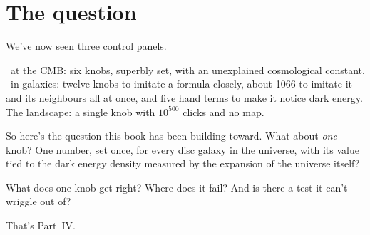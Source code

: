 \section{The question}

We've now seen three control panels.

\LCDM\ at the CMB: six knobs, superbly set, with an unexplained cosmological constant. \LCDM\ in galaxies: twelve knobs to imitate a formula closely, about 1066 to imitate it and its neighbours all at once, and five hand terms to make it notice dark energy. The landscape: a single knob with $10^{500}$ clicks and no map.

So here's the question this book has been building toward. What about \emph{one} knob? One number, set once, for every disc galaxy in the universe, with its value tied to the dark energy density measured by the expansion of the universe itself?

What does one knob get right? Where does it fail? And is there a test it can't wriggle out of?

That's Part~IV.
